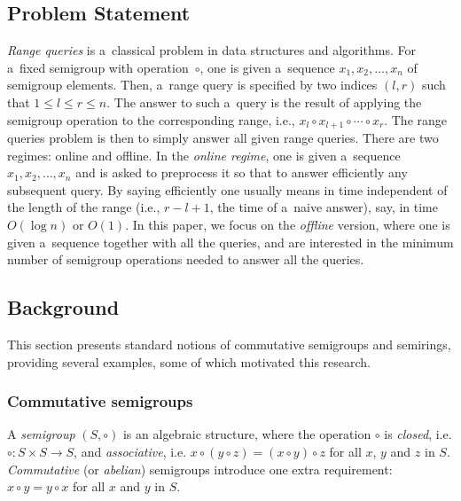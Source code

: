 \documentclass[11pt,letterpaper]{article}
\begin{document}
\subsection{Problem Statement}
{\em Range queries} is a~classical problem in data structures and algorithms. For a~fixed semigroup with operation~$\circ$, one is given a~sequence $x_1, x_2, \dotsc, x_n$ of semigroup elements. Then, a~range query is specified by two indices $(l,r)$ such that $1 \le l \le r \le n$. The answer to such a~query is the result of applying the semigroup operation to the corresponding range, i.e., $x_l \circ x_{l+1} \circ \dotsb \circ x_r$. The range queries problem is then to simply answer all given range queries. There are two regimes: online and offline. In the {\em online regime}, one is given a~sequence $x_1, x_2, \dotsc, x_n$ and is asked to preprocess it so that to answer efficiently any subsequent query. By saying efficiently one usually means in time independent of the length of the range (i.e., $r-l+1$, the time of a~naive answer), say, in time $O(\log n)$ or $O(1)$. In this paper, we focus on the {\em offline} version, where one is given a~sequence together with all the queries, and are interested in the minimum number of semigroup operations needed to answer all the queries.


\subsection{Background}

This section presents standard notions of commutative semigroups and semirings,
providing several examples, some of which motivated this research.

\subsubsection{Commutative semigroups}

A \emph{semigroup} $(S, \circ)$ is an algebraic structure, where the operation
$\circ$ is \emph{closed}, i.e. $\circ : S\times S \rightarrow S$, and
\emph{associative}, i.e.
$x \circ (y \circ z) = (x \circ y) \circ z$ for all $x$, $y$ and $z$ in $S$.
\emph{Commutative} (or \emph{abelian}) semigroups introduce one extra
requirement: $x \circ y = y \circ x$ for all $x$ and $y$ in $S$.
\end{document}
